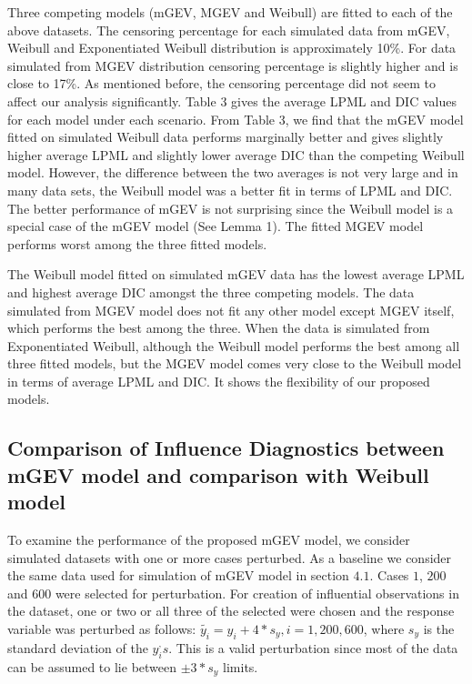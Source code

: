 \documentclass[smallextended]{svjour3}       %
\begin{document}
{Three competing models (mGEV, MGEV and Weibull) are fitted to each of the above datasets. The censoring percentage for each simulated data from mGEV, Weibull and Exponentiated Weibull distribution is approximately 10\%. For data simulated from MGEV distribution censoring percentage is slightly higher and is close to 17\%. As mentioned before, the censoring percentage did not seem to affect our analysis significantly. Table 3 gives the average LPML and DIC values for each model under each scenario. From Table 3, we find that the mGEV model fitted on simulated Weibull data performs marginally better and gives slightly higher average LPML and slightly lower average DIC than the competing Weibull model. However, the difference between the two averages is not very large and in many data sets, the Weibull model was a better fit in terms of LPML and DIC. The better performance of mGEV is not surprising since the Weibull model is a special case of the mGEV model (See Lemma 1). The fitted MGEV model performs worst among the three fitted models. 


The Weibull model fitted on simulated mGEV data has the lowest average LPML and highest average DIC amongst the three competing models. The data simulated from MGEV model does not fit any other model except MGEV itself, which performs the best among the three. When the data is simulated from Exponentiated Weibull, although the Weibull model performs the best among all three fitted models, but the MGEV model comes very close to the Weibull model in terms of average LPML and DIC. It shows the flexibility of our proposed models.



\subsection{Comparison of Influence Diagnostics between mGEV model and comparison with Weibull model}
To examine the performance of the proposed mGEV model, we consider simulated datasets with one or more cases perturbed. As a baseline we consider the same data used for simulation of mGEV model in section $4.1$. Cases $1$, $200$ and $600$ were selected for perturbation. For creation of influential observations in the dataset, one or two or all three of the selected were chosen and the response variable was perturbed as follows: $\tilde{y_i} = y_i + 4*s_y, i = 1, 200, 600$, where $s_y$ is the standard deviation of the $y_i^,s$. This is a valid perturbation since most of the data can be assumed to lie between $\pm 3*s_y $ limits.


}
\end{document}

